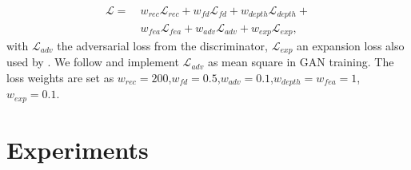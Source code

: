 \documentclass[final]{cvpr}
\begin{document}
\begin{align}
\mathcal{L} = ~& w_{rec} \mathcal{L}_{rec}+w_{fd}\mathcal{L}_{fd}+w_{depth}\mathcal{L}_{depth}+\\\nonumber
	& w_{fea}\mathcal{L}_{fea}+w_{adv}\mathcal{L}_{adv} + w_{exp}\mathcal{L}_{exp},
\end{align} 
with $\mathcal{L}_{adv}$ the adversarial loss from the discriminator, $\mathcal{L}_{exp}$ an expansion loss also used by \cite{liu2019morphing}. We follow \cite{mao2017least} and implement $\mathcal{L}_{adv}$ as mean square in GAN training. The loss weights are set as 
$w_{rec}=200$,$w_{fd}=0.5$,$w_{adv}=0.1$,$w_{depth}=w_{fea}=1$,$w_{exp}=0.1$.



\section{Experiments}
\end{document}
